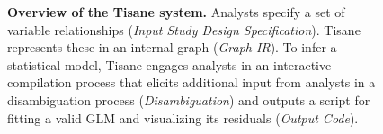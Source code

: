 {\begin{figure}
%
        \caption{\textbf{Overview of the Tisane system.} Analysts specify a set of variable relationships (\textit{Input Study Design Specification}). Tisane represents these in an internal graph (\textit{Graph IR}). To infer a statistical model, Tisane engages analysts in an interactive compilation process that elicits additional input from analysts in a disambiguation process (\textit{Disambiguation}) and outputs a script for fitting a valid GLM and visualizing its residuals (\textit{Output Code}).}

\end{figure}}
